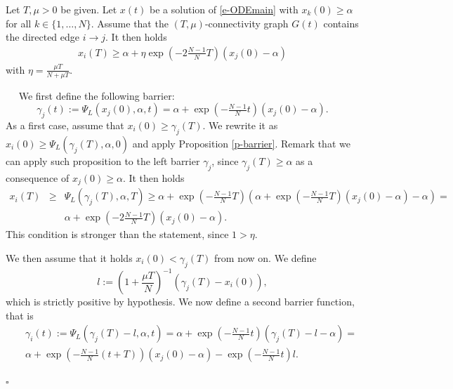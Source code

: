 \documentclass[10pt,a4paper]{amsart}
\newenvironment{proof}{{\it Proof.}~~}{\hfill$\square$}
\begin{document}
\begin{proposition}\label{p-1step} Let $T,\mu>0$ be given. Let $x(t)$ be a solution of \eqref{e-ODEmain} with $x_k(0)\geq \alpha$ for all $k\in\{1,\ldots,N\}$. Assume that the $(T,\mu)$-connectivity graph $G(t)$ contains the directed edge $i\to j$. It then holds
\begin{eqnarray}
\label{e-1step}
x_i(T)\geq \alpha+\eta\exp(-2\tfrac{N-1}{N}T)(x_j(0)-\alpha)
\end{eqnarray}
with $\eta=\frac{\mu T}{N+\mu T}$.
\end{proposition}

\begin{proof}
We first define the following barrier: $$\gamma_j(t):=\Psi_L(x_j(0),\alpha,t)=\alpha+\exp(-\tfrac{N-1}{N}t)(x_j(0)-\alpha).$$
As a first case, assume that $x_i(0)\geq \gamma_j(T)$. We rewrite it as $x_i(0)\geq \Psi_L(\gamma_j(T),\alpha,0)$  and apply Proposition \ref{p-barrier}. Remark that we can apply such proposition
to the left barrier $\gamma_j$, since $\gamma_j(T)\geq \alpha$ as a consequence of $x_j(0)\geq\alpha$. It then holds
\begin{eqnarray*}
x_i(T)&\geq& \Psi_L(\gamma_j(T),\alpha,T)\geq \alpha+\exp(-\tfrac{N-1}{N}T)(\alpha+\exp(-\tfrac{N-1}{N}T)(x_j(0)-\alpha)-\alpha)=\\
&&\alpha+\exp(-2\tfrac{N-1}{N}T)(x_j(0)-\alpha).
\end{eqnarray*}
This condition is stronger than the statement, since $1>\eta$.


We then assume that it holds $x_i(0)<\gamma_j(T)$ from now on. We define 
$$l:=\left(1+\frac{\mu T}N\right)^{-1}(\gamma_j(T)-x_i(0)),$$
which is strictly positive by hypothesis. We now define a second barrier function, that is
\begin{eqnarray*}
&&\gamma_i(t):=\Psi_L(\gamma_j(T)-l,\alpha,t)=\alpha+\exp(-\tfrac{N-1}{N}t)(\gamma_j(T)-l-\alpha)=\\
&&\alpha+\exp(-\tfrac{N-1}{N}(t+T))(x_j(0)-\alpha)-\exp(-\tfrac{N-1}{N}t)l.
\end{eqnarray*}


\end{proof}
\end{document}
